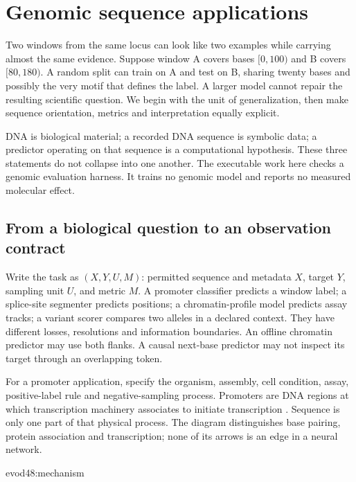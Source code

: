 \chapter{Genomic sequence applications}
\label{evod48:chapter}
Two windows from the same locus can look like two examples while carrying
almost the same evidence. Suppose window A covers bases $[0,100)$ and B
covers $[80,180)$. A random split can train on A and test on B, sharing twenty
bases and possibly the very motif that defines the label. A larger model
cannot repair the resulting scientific question. We begin with the unit of
generalization, then make sequence orientation, metrics and interpretation
equally explicit.

DNA is biological material; a recorded DNA sequence is symbolic data; a
predictor operating on that sequence is a computational hypothesis. These
three statements do not collapse into one another. The executable work here
checks a genomic evaluation harness. It trains no genomic model and reports
no measured molecular effect.

\section{From a biological question to an observation contract}
Write the task as $(X,Y,U,M)$: permitted sequence and metadata $X$, target
$Y$, sampling unit $U$, and metric $M$. A promoter classifier predicts a
window label; a splice-site segmenter predicts positions; a chromatin-profile
model predicts assay tracks; a variant scorer compares two alleles in a
declared context. They have different losses, resolutions and information
boundaries. An offline chromatin predictor may use both flanks. A causal
next-base predictor may not inspect its target through an overlapping token.

For a promoter application, specify the organism, assembly, cell condition,
assay, positive-label rule and negative-sampling process. Promoters are DNA
regions at which transcription machinery associates to initiate transcription
\cite{evod48:promoter}. Sequence is only one part of that physical process.
The diagram distinguishes base pairing, protein association and transcription;
none of its arrows is an edge in a neural network.

{evod48:mechanism}

